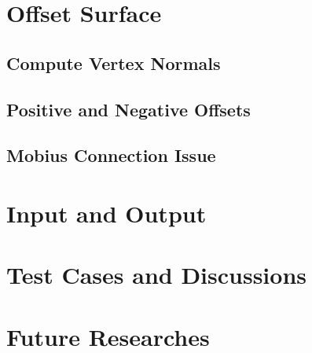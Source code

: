 \documentclass[12pt]{article}
\begin{document}
\section{Offset Surface} \label{sec:offset}

\subsection{Compute Vertex Normals}

\subsection{Positive and Negative Offsets}

\subsection{Mobius Connection Issue}

\section{Input and Output}

\section{Test Cases and Discussions}

\section{Future Researches}
\end{document}
